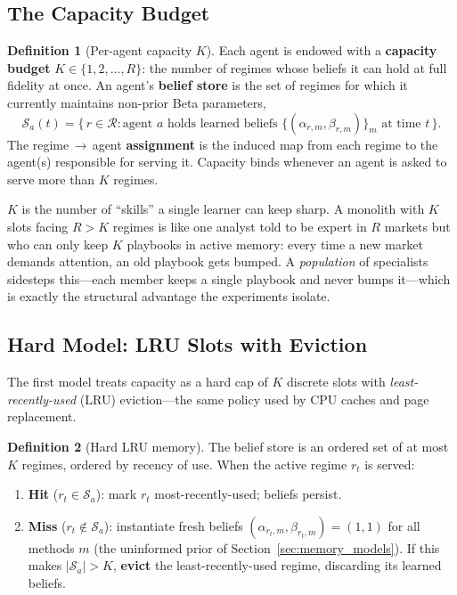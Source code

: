 \documentclass[11pt,a4paper]{article}
\theoremstyle{definition}
\newtheorem{definition}{Definition}[section]
\theoremstyle{plain}
\begin{document}
\subsection{The Capacity Budget}

\begin{definition}[Per-agent capacity $K$]
Each agent is endowed with a \textbf{capacity budget} $K \in \{1, 2, \ldots, R\}$:
the number of regimes whose beliefs it can hold at full fidelity at once. An
agent's \textbf{belief store} is the set of regimes for which it currently
maintains non-prior Beta parameters,
\[
\mathcal{S}_a(t) = \bigl\{\, r \in \mathcal{R} : \text{agent } a \text{ holds learned beliefs } \{(\alpha_{r,m}, \beta_{r,m})\}_m \text{ at time } t \,\bigr\}.
\]
The regime\,$\to$\,agent \textbf{assignment} is the induced map from each regime to
the agent(s) responsible for serving it. Capacity binds whenever an agent is
asked to serve more than $K$ regimes.
\end{definition}

\begin{intuition}
$K$ is the number of ``skills'' a single learner can keep sharp. A monolith with
$K$ slots facing $R > K$ regimes is like one analyst told to be expert in $R$
markets but who can only keep $K$ playbooks in active memory: every time a new
market demands attention, an old playbook gets bumped. A \emph{population} of
specialists sidesteps this---each member keeps a single playbook and never bumps
it---which is exactly the structural advantage the experiments isolate.
\end{intuition}

\subsection{Hard Model: LRU Slots with Eviction}
\label{sec:hard_lru}

The first model treats capacity as a hard cap of $K$ discrete slots with
\emph{least-recently-used} (LRU) eviction---the same policy used by CPU caches
and page replacement.

\begin{definition}[Hard LRU memory]
The belief store is an ordered set of at most $K$ regimes, ordered by recency of
use. When the active regime $r_t$ is served:
\begin{enumerate}
    \item \textbf{Hit} ($r_t \in \mathcal{S}_a$): mark $r_t$ most-recently-used; beliefs persist.
    \item \textbf{Miss} ($r_t \notin \mathcal{S}_a$): instantiate fresh beliefs
    $(\alpha_{r_t,m}, \beta_{r_t,m}) = (1,1)$ for all methods $m$ (the uninformed
    prior of Section~\ref{sec:memory_models}). If this makes $|\mathcal{S}_a| > K$,
    \textbf{evict} the least-recently-used regime, discarding its learned beliefs.
\end{enumerate}
\end{definition}
\end{document}
